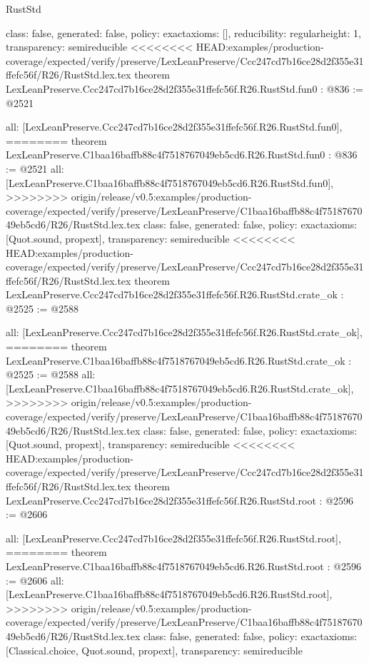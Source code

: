\begin{lexlean}{RustStd}
\begin{coremodule}
{\begin{coremodule}
{{{  class: false,
  generated: false,
  policy: exact{axioms: []},
  reducibility: regular{height: 1},
  transparency: semireducible
}
<<<<<<<< HEAD:examples/production-coverage/expected/verify/preserve/LexLeanPreserve/Ccc247cd7b16ce28d2f355e31ffefc56f/R26/RustStd.lex.tex
theorem LexLeanPreserve.Ccc247cd7b16ce28d2f355e31ffefc56f.R26.RustStd.fun0 : @836 := @2521 {
  all: [LexLeanPreserve.Ccc247cd7b16ce28d2f355e31ffefc56f.R26.RustStd.fun0],
========
theorem LexLeanPreserve.C1baa16baffb88c4f7518767049eb5cd6.R26.RustStd.fun0 : @836 := @2521 {
  all: [LexLeanPreserve.C1baa16baffb88c4f7518767049eb5cd6.R26.RustStd.fun0],
>>>>>>>> origin/release/v0.5:examples/production-coverage/expected/verify/preserve/LexLeanPreserve/C1baa16baffb88c4f7518767049eb5cd6/R26/RustStd.lex.tex
  class: false,
  generated: false,
  policy: exact{axioms: [Quot.sound, propext]},
  transparency: semireducible
}
<<<<<<<< HEAD:examples/production-coverage/expected/verify/preserve/LexLeanPreserve/Ccc247cd7b16ce28d2f355e31ffefc56f/R26/RustStd.lex.tex
theorem LexLeanPreserve.Ccc247cd7b16ce28d2f355e31ffefc56f.R26.RustStd.crate_ok : @2525 := @2588 {
  all: [LexLeanPreserve.Ccc247cd7b16ce28d2f355e31ffefc56f.R26.RustStd.crate_ok],
========
theorem LexLeanPreserve.C1baa16baffb88c4f7518767049eb5cd6.R26.RustStd.crate_ok : @2525 := @2588 {
  all: [LexLeanPreserve.C1baa16baffb88c4f7518767049eb5cd6.R26.RustStd.crate_ok],
>>>>>>>> origin/release/v0.5:examples/production-coverage/expected/verify/preserve/LexLeanPreserve/C1baa16baffb88c4f7518767049eb5cd6/R26/RustStd.lex.tex
  class: false,
  generated: false,
  policy: exact{axioms: [Quot.sound, propext]},
  transparency: semireducible
}
<<<<<<<< HEAD:examples/production-coverage/expected/verify/preserve/LexLeanPreserve/Ccc247cd7b16ce28d2f355e31ffefc56f/R26/RustStd.lex.tex
theorem LexLeanPreserve.Ccc247cd7b16ce28d2f355e31ffefc56f.R26.RustStd.root : @2596 := @2606 {
  all: [LexLeanPreserve.Ccc247cd7b16ce28d2f355e31ffefc56f.R26.RustStd.root],
========
theorem LexLeanPreserve.C1baa16baffb88c4f7518767049eb5cd6.R26.RustStd.root : @2596 := @2606 {
  all: [LexLeanPreserve.C1baa16baffb88c4f7518767049eb5cd6.R26.RustStd.root],
>>>>>>>> origin/release/v0.5:examples/production-coverage/expected/verify/preserve/LexLeanPreserve/C1baa16baffb88c4f7518767049eb5cd6/R26/RustStd.lex.tex
  class: false,
  generated: false,
  policy: exact{axioms: [Classical.choice, Quot.sound, propext]},
  transparency: semireducible
}

}}}}}
\end{coremodule}}
\end{coremodule}
\end{lexlean}
